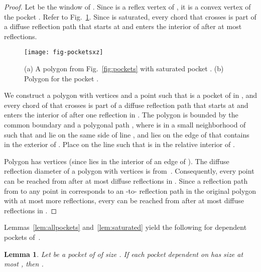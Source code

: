 \documentclass[12pt]{article}
\newtheorem{lemma}{Lemma}
\begin{document}
\begin{proof}
Let  be the window of .
Since  is a reflex vertex of , it is a convex vertex of the pocket .
Refer to Fig.~\ref{fig:pprime}. Since  is saturated, every chord that crosses 
is part of a diffuse reflection path that starts at 
and enters the interior of  after at most  reflections.

\begin{figure}[htp]
  \centering
  \texttt{[image: fig-pocketsxz]}
  \caption{\label{fig:pprime}
(a) A polygon  from Fig.~\ref{fig:pockets} with saturated pocket .
(b) Polygon  for the pocket .}
\end{figure}

We construct a polygon  with  vertices and a point  such that  is a pocket of  in ,
and every chord of  that crosses  is part of a diffuse reflection path that starts at  and enters the interior of  after one reflection in .
The polygon  is bounded by the common boundary  and a polygonal path , where  is in a small neighborhood of  such that  and  lie on the same side of line , and  lies on the edge of  that contains  in the exterior of . Place  on the line  such that  is in the relative interior of .

Polygon  has  vertices (since  lies in the interior of an edge of ). The diffuse reflection diameter of a polygon with  vertices is  from~\cite{Us}. Consequently, every point  can be reached from  after at most  diffuse reflections in .
Since a reflection path from  to any point  in  corresponds to an -to- reflection path in the original polygon 
with at most  more reflections, every  can be reached from  after at most  diffuse reflections in .
\end{proof}

Lemmas~\ref{lem:allpockets} and~\ref{lem:saturated} yield the following for dependent pockets of~.

\begin{lemma}\label{lem:dependent}
Let  be a pocket of  of size .
If each pocket dependent on  has size at most ,
  then .
\end{lemma}
\end{document}
